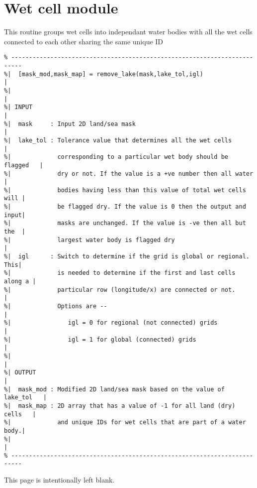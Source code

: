 \documentclass[12pt]{article}
\newcommand{\bpagea}{\strut

\vspace{2.5in} \centerline{This page is intentionally left blank.}}
\begin{document}
\section{Wet cell module}
This routine groups wet cells into independant water bodies with all the wet cells connected to each other sharing the same unique ID
\begin{verbatim}
% -------------------------------------------------------------------------
%|  [mask_mod,mask_map] = remove_lake(mask,lake_tol,igl)                  | 
%|                                                                        |
%| INPUT                                                                  |
%|  mask     : Input 2D land/sea mask                                     |
%|  lake_tol : Tolerance value that determines all the wet cells          | 
%|             corresponding to a particular wet body should be flagged   | 
%|             dry or not. If the value is a +ve number then all water    | 
%|             bodies having less than this value of total wet cells will |
%|             be flagged dry. If the value is 0 then the output and input|
%|             masks are unchanged. If the value is -ve then all but the  |
%|             largest water body is flagged dry                          |
%|  igl      : Switch to determine if the grid is global or regional. This| 
%|             is needed to determine if the first and last cells along a | 
%|             particular row (longitude/x) are connected or not.         |
%|             Options are --                                             |
%|                igl = 0 for regional (not connected) grids              |
%|                igl = 1 for global (connected) grids                    |
%|                                                                        |
%| OUTPUT                                                                 |
%|  mask_mod : Modified 2D land/sea mask based on the value of lake_tol   |
%|  mask_map : 2D array that has a value of -1 for all land (dry) cells   |
%|             and unique IDs for wet cells that are part of a water body.|
%|                                                                        |
% -------------------------------------------------------------------------
\end{verbatim}

\bpagea
\end{document}
